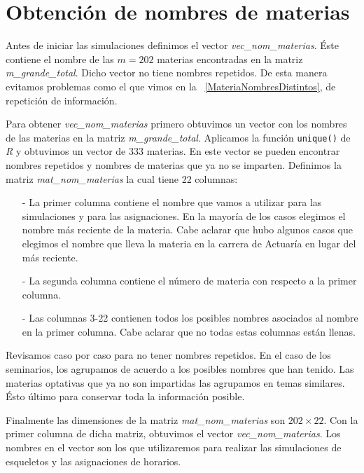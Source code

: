 \section{Obtención de nombres de materias} \label{Sec_NomMaterias}

Antes de iniciar las simulaciones definimos el vector \textit{vec\_nom\_materias}. Éste contiene el nombre de las $m = 202$ materias encontradas en la matriz \textit{m\_grande\_total}. Dicho vector  no tiene nombres repetidos. De esta manera evitamos problemas como el que vimos en la \figurename{~\ref{MateriaNombresDistintos}}, de repetición de información.

Para obtener \textit{vec\_nom\_materias} primero obtuvimos un vector con los nombres de las materias en la matriz \textit{m\_grande\_total}. Aplicamos la función \verb+unique()+ de \textit{R} y obtuvimos un vector de 333 materias. En este vector se pueden encontrar nombres repetidos y nombres de materias que ya no se imparten. Definimos la matriz \textit{mat\_nom\_materias} la cual tiene 22 columnas:

\begin{itemize}
\item[-] La primer columna contiene el nombre que vamos a utilizar para las simulaciones y para las asignaciones. En la mayoría de los casos elegimos el nombre más reciente de la materia. Cabe aclarar que hubo algunos casos que elegimos el nombre que lleva la materia en la carrera de Actuaría en lugar del más reciente.

\item[-] La segunda columna contiene el número de materia con respecto a la primer columna.

\item[-] Las columnas 3-22 contienen todos los posibles nombres asociados al nombre en la primer columna. Cabe aclarar que no todas estas columnas están llenas.
\end{itemize}

Revisamos caso por caso para no tener nombres repetidos. En el caso de los seminarios, los agrupamos de acuerdo a los posibles nombres que han tenido. Las materias optativas que ya no son impartidas las agrupamos en temas similares. Ésto último para conservar toda la información posible. %

Finalmente las dimensiones de la matriz \textit{mat\_nom\_materias} son $202 \times 22$. Con la primer columna de dicha matriz, obtuvimos el vector \textit{vec\_nom\_materias}. Los nombres en el vector son los que utilizaremos para realizar las simulaciones de esqueletos y las asignaciones de horarios.
